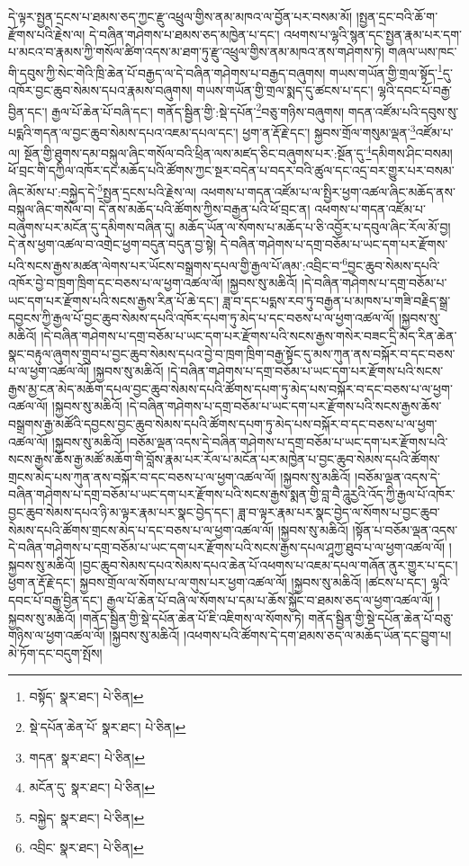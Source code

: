 དེ་ལྟར་སྤྱན་དྲངས་པ་ཐམས་ཅད་ཀྱང་རྫུ་འཕྲུལ་གྱིས་ནམ་མཁའ་ལ་བྱོན་པར་བསམ་མོ། །སྤྱན་དྲང་བའི་ཆོ་ག་རྫོགས་པའི་རྗེས་ལ། དེ་བཞིན་གཤེགས་པ་ཐམས་ཅད་མཁྱེན་པ་དང་། འཕགས་པ་ལྷའི་སྙན་དང་སྤྱན་རྣམ་པར་དག་པ་མངའ་བ་རྣམས་ཀྱི་གསོལ་ཚིག་འདས་མ་ཐག་ཏུ་རྫུ་འཕྲུལ་གྱིས་ནམ་མཁའ་ནས་གཤེགས་ཏེ། གཞལ་ཡས་ཁང་གི་དབུས་ཀྱི་སེང་གེའི་ཁྲི་ཆེན་པོ་བརྒྱད་ལ་དེ་བཞིན་གཤེགས་པ་བརྒྱད་བཞུགས། གཡས་གཡོན་གྱི་གྲལ་སྟོད་\footnote{བསྟོད་  སྣར་ཐང་།  པེ་ཅིན། }དུ་འཁོར་བྱང་ཆུབ་སེམས་དཔའ་རྣམས་བཞུགས། གཡས་གཡོན་གྱི་གྲལ་སྨད་དུ་ཚངས་པ་དང་། ལྷའི་དབང་པོ་བརྒྱ་བྱིན་དང་། རྒྱལ་པོ་ཆེན་པོ་བཞི་དང་། གནོད་སྦྱིན་གྱི་:སྡེ་དཔོན་\footnote{སྡེ་དཔོན་ཆེན་པོ་  སྣར་ཐང་།  པེ་ཅིན། }བཅུ་གཉིས་བཞུགས། གདན་འཛོམ་པའི་དབུས་སུ་པདྨའི་གདན་ལ་བྱང་ཆུབ་སེམས་དཔའ་འཇམ་དཔལ་དང་། ཕྱག་ན་རྡོ་རྗེ་དང་། སྐྱབས་གྲོལ་གསུམ་ལྡན་\footnote{གདན་  སྣར་ཐང་།  པེ་ཅིན། }འཛོམ་པ་ལ། སྔོན་གྱི་ཐུགས་དམ་བསྐུལ་ཞིང་གསོལ་བའི་ཕྲིན་ལས་མཛད་ཅིང་བཞུགས་པར་:སྔོན་དུ་\footnote{མངོན་དུ་  སྣར་ཐང་།  པེ་ཅིན། }དམིགས་ཤིང་བསམ། ཕོ་བྲང་གི་དཀྱིལ་འཁོར་དང་མཆོད་པའི་ཚོགས་ཀྱང་སྔར་བདེན་པ་བདར་བའི་ཚུལ་དང་འདྲ་བར་གྱུར་པར་བསམ་ཞིང་མོས་པ་:བསྐྱེད་དེ་\footnote{བསྐྱེད་  སྣར་ཐང་།  པེ་ཅིན། }སྤྱན་དྲངས་པའི་རྗེས་ལ། འཕགས་པ་གདན་འཛོམ་པ་ལ་སྤྱིར་ཕྱག་འཚལ་ཞིང་མཆོད་ནས་བསྐུལ་ཞིང་གསོལ་བ། དེ་ནས་མཆོད་པའི་ཚོགས་ཀྱིས་བརྒྱན་པའི་ཕོ་བྲང་ན། འཕགས་པ་གདན་འཛོམ་པ་བཞུགས་པར་མངོན་དུ་དམིགས་བཞིན་དུ། མཆོད་ཡོན་ལ་སོགས་པ་མཆོད་པ་ཅི་འབྱོར་པ་དབུལ་ཞིང་རོལ་མོ་བྱ། དེ་ནས་ཕྱག་འཚལ་བ་འགྲེང་ཕྱག་བདུན་བདུན་བྱ་སྟེ། དེ་བཞིན་གཤེགས་པ་དགྲ་བཅོམ་པ་ཡང་དག་པར་རྫོགས་པའི་སངས་རྒྱས་མཚན་ལེགས་པར་ཡོངས་བསྒྲགས་དཔལ་གྱི་རྒྱལ་པོ་ཞམ་:འབྲིང་བ་\footnote{འབྲིང་  སྣར་ཐང་།  པེ་ཅིན། }བྱང་ཆུབ་སེམས་དཔའི་འཁོར་བྱེ་བ་ཁྲག་ཁྲིག་དང་བཅས་པ་ལ་ཕྱག་འཚལ་ལོ། །སྐྱབས་སུ་མཆིའོ། །དེ་བཞིན་གཤེགས་པ་དགྲ་བཅོམ་པ་ཡང་དག་པར་རྫོགས་པའི་སངས་རྒྱས་རིན་པོ་ཆེ་དང་། ཟླ་བ་དང་པདྨས་རབ་ཏུ་བརྒྱན་པ་མཁས་པ་གཟི་བརྗིད་སྒྲ་དབྱངས་ཀྱི་རྒྱལ་པོ་བྱང་ཆུབ་སེམས་དཔའི་འཁོར་དཔག་ཏུ་མེད་པ་དང་བཅས་པ་ལ་ཕྱག་འཚལ་ལོ། །སྐྱབས་སུ་མཆིའོ། །དེ་བཞིན་གཤེགས་པ་དགྲ་བཅོམ་པ་ཡང་དག་པར་རྫོགས་པའི་སངས་རྒྱས་གསེར་བཟང་དྲི་མེད་རིན་ཆེན་སྣང་བརྟུལ་ཞུགས་གྲུབ་པ་བྱང་ཆུབ་སེམས་དཔའ་བྱེ་བ་ཁྲག་ཁྲིག་བརྒྱ་སྟོང་དུ་མས་ཀུན་ནས་བསྐོར་བ་དང་བཅས་པ་ལ་ཕྱག་འཚལ་ལོ། །སྐྱབས་སུ་མཆིའོ། །དེ་བཞིན་གཤེགས་པ་དགྲ་བཅོམ་པ་ཡང་དག་པར་རྫོགས་པའི་སངས་རྒྱས་མྱ་ངན་མེད་མཆོག་དཔལ་བྱང་ཆུབ་སེམས་དཔའི་ཚོགས་དཔག་ཏུ་མེད་པས་བསྐོར་བ་དང་བཅས་པ་ལ་ཕྱག་འཚལ་ལོ། །སྐྱབས་སུ་མཆིའོ། །དེ་བཞིན་གཤེགས་པ་དགྲ་བཅོམ་པ་ཡང་དག་པར་རྫོགས་པའི་སངས་རྒྱས་ཆོས་བསྒྲགས་རྒྱ་མཚོའི་དབྱངས་བྱང་ཆུབ་སེམས་དཔའི་ཚོགས་དཔག་ཏུ་མེད་པས་བསྐོར་བ་དང་བཅས་པ་ལ་ཕྱག་འཚལ་ལོ། །སྐྱབས་སུ་མཆིའོ། །བཅོམ་ལྡན་འདས་དེ་བཞིན་གཤེགས་པ་དགྲ་བཅོམ་པ་ཡང་དག་པར་རྫོགས་པའི་སངས་རྒྱས་ཆོས་རྒྱ་མཚོ་མཆོག་གི་བློས་རྣམ་པར་རོལ་པ་མངོན་པར་མཁྱེན་པ་བྱང་ཆུབ་སེམས་དཔའི་ཚོགས་གྲངས་མེད་པས་ཀུན་ནས་བསྐོར་བ་དང་བཅས་པ་ལ་ཕྱག་འཚལ་ལོ། །སྐྱབས་སུ་མཆིའོ། །བཅོམ་ལྡན་འདས་དེ་བཞིན་གཤེགས་པ་དགྲ་བཅོམ་པ་ཡང་དག་པར་རྫོགས་པའི་སངས་རྒྱས་སྨན་གྱི་བླ་བཻ་ཌཱུརྱའི་འོད་ཀྱི་རྒྱལ་པོ་འཁོར་བྱང་ཆུབ་སེམས་དཔའ་ཉི་མ་ལྟར་རྣམ་པར་སྣང་བྱེད་དང་། ཟླ་བ་ལྟར་རྣམ་པར་སྣང་བྱེད་ལ་སོགས་པ་བྱང་ཆུབ་སེམས་དཔའི་ཚོགས་གྲངས་མེད་པ་དང་བཅས་པ་ལ་ཕྱག་འཚལ་ལོ། །སྐྱབས་སུ་མཆིའོ། །སྟོན་པ་བཅོམ་ལྡན་འདས་དེ་བཞིན་གཤེགས་པ་དགྲ་བཅོམ་པ་ཡང་དག་པར་རྫོགས་པའི་སངས་རྒྱས་དཔལ་ཤཱཀྱ་ཐུབ་པ་ལ་ཕྱག་འཚལ་ལོ། །སྐྱབས་སུ་མཆིའོ། །བྱང་ཆུབ་སེམས་དཔའ་སེམས་དཔའ་ཆེན་པོ་འཕགས་པ་འཇམ་དཔལ་གཞོན་ནུར་གྱུར་པ་དང་། ཕྱག་ན་རྡོ་རྗེ་དང་། སྐྱབས་གྲོལ་ལ་སོགས་པ་ལ་གུས་པར་ཕྱག་འཚལ་ལོ། །སྐྱབས་སུ་མཆིའོ། །ཚངས་པ་དང་། ལྷའི་དབང་པོ་བརྒྱ་བྱིན་དང་། རྒྱལ་པོ་ཆེན་པོ་བཞི་ལ་སོགས་པ་དམ་པ་ཆོས་སྐྱོང་བ་ཐམས་ཅད་ལ་ཕྱག་འཚལ་ལོ། །སྐྱབས་སུ་མཆིའོ། །གནོད་སྦྱིན་གྱི་སྡེ་དཔོན་ཆེན་པོ་ཇི་འཇིགས་ལ་སོགས་ཏེ། གནོད་སྦྱིན་གྱི་སྡེ་དཔོན་ཆེན་པོ་བཅུ་གཉིས་ལ་ཕྱག་འཚལ་ལོ། །སྐྱབས་སུ་མཆིའོ། །འཕགས་པའི་ཚོགས་དེ་དག་ཐམས་ཅད་ལ་མཆོད་ཡོན་དང་བྱུག་པ། མེ་ཏོག་དང་བདུག་སྤོས། 